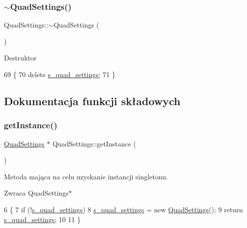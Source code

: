 \subsubsection{\texorpdfstring{$\sim$\+Quad\+Settings()}{~QuadSettings()}}
{\footnotesize\ttfamily Quad\+Settings\+::$\sim$\+Quad\+Settings (\begin{DoxyParamCaption}{ }\end{DoxyParamCaption})\hspace{0.3cm}{\ttfamily [private]}}

Destruktor 
\begin{DoxyCode}
69 \{
70     \textcolor{keyword}{delete} \mbox{\hyperlink{class_quad_settings_a5d46fe34f768222c9af872e0f52995a6}{s\_quad\_settings}};
71 \}
\end{DoxyCode}


\subsection{Dokumentacja funkcji składowych}
\mbox{\label{class_quad_settings_a20d7cfd0c56c11adcdf75c5e3011de67}} 
\subsubsection{\texorpdfstring{get\+Instance()}{getInstance()}}
{\footnotesize\ttfamily \mbox{\hyperlink{class_quad_settings}{Quad\+Settings}} $\ast$ Quad\+Settings\+::get\+Instance (\begin{DoxyParamCaption}{ }\end{DoxyParamCaption})\hspace{0.3cm}{\ttfamily [static]}}

Metoda mająca na celu uzyskanie instancji singletonu. \begin{DoxyReturn}{Zwraca}
Quad\+Settings$\ast$ 
\end{DoxyReturn}

\begin{DoxyCode}
6 \{
7     \textcolor{keywordflow}{if} (!\mbox{\hyperlink{class_quad_settings_a5d46fe34f768222c9af872e0f52995a6}{s\_quad\_settings}})
8         \mbox{\hyperlink{class_quad_settings_a5d46fe34f768222c9af872e0f52995a6}{s\_quad\_settings}} = \textcolor{keyword}{new} \mbox{\hyperlink{class_quad_settings_a2c541d4338024c495bef33ff8b990a59}{QuadSettings}}();
9     \textcolor{keywordflow}{return} \mbox{\hyperlink{class_quad_settings_a5d46fe34f768222c9af872e0f52995a6}{s\_quad\_settings}};
10 
11 \}
\end{DoxyCode}
\mbox{\label{class_quad_settings_a82d6bd77e99f58c1a24122548449c6bc}} 
